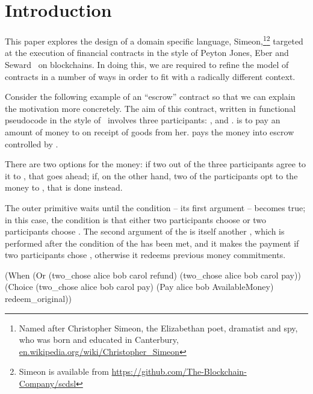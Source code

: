 \documentclass[runningheads]{llncs}
\begin{document}
\section{Introduction}
\label{sec:intro}


This paper explores the design of a domain specific language, Simeon,\footnote{Named after Christopher 
Simeon, the Elizabethan poet, dramatist and spy, who was born and educated in Canterbury,  
\url{en.wikipedia.org/wiki/Christopher_Simeon}}\footnote{Simeon is available from 
\url{https://github.com/The-Blockchain-Company/scdsl}} targeted at the execution of financial contracts in the style of 
Peyton Jones, Eber and Seward~\cite{PeytonJones:2000} on blockchains. In doing this, we are required to refine the 
model of contracts in a number of ways in order to fit with a radically different context. 

Consider the following example of an ``escrow'' contract so that we can explain the motivation 
more concretely. The aim of this contract, written in functional pseudocode in the style of~\cite{PeytonJones:2000} 
involves three participants: ,  and .  
is to pay an amount of money to  on receipt of goods from her.  pays the money 
into escrow controlled by .

There are two options for the money: if two out of the three participants agree to  it to 
, that goes ahead; if, on the other hand, two of the participants opt to  the 
money to , that is done instead.

The outer primitive  waits until the condition -- its first argument -- 
becomes true; in this case, the condition is that either two participants choose  or two 
participants choose . The second argument of the  is itself another 
, which is performed after the condition of the  has been met, and it makes 
the payment if two participants chose , otherwise it redeems previous money commitments.

\begin{haskellcode}
(When (Or (two_chose alice bob carol refund)
          (two_chose alice bob carol pay))
      (Choice (two_chose alice bob carol pay)
              (Pay alice bob AvailableMoney)
              redeem_original))
\end{haskellcode}
\end{document}
